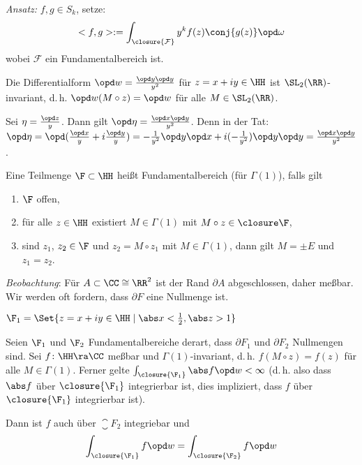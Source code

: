 \emph{Ansatz:} $f, g \in S_k$, setze:
\[
<f,g> := \int_{\closure{\mathcal F}} y^k f(z) \conj{g(z)} \opd \omega
\]
wobei $\mathcal F$ ein Fundamentalbereich ist.


\begin{satz}
	Die Differentialform $\opd w = \frac{\opd y \opd y}{y^2}$ für $z=x+iy\in\HH$ ist $\SL_2(\RR)$-invariant, d.\,h. $\opd w(M\circ z) = \opd w$ für alle $M\in\SL_2(\RR)$.
\end{satz}

\begin{beme}
	Sei $\eta = \frac{\opd z}{y}$. Dann gilt $\opd \eta = \frac{\opd x \opd y}{y^2}$.
	Denn in der Tat: $\opd \eta = \opd (\frac{\opd x}{y} + i\frac{\opd y}{y}) = -\frac{1}{y^2} \opd y \opd x + i(-\frac{1}{y^2}) \opd y \opd y = \frac{\opd x \opd y}{y^2}$.
\end{beme}

\begin{erin}
	Eine Teilmenge $\F \subset \HH$ heißt Fundamentalbereich (für $\Gamma(1)$), falls gilt
	\begin{enumerate}
		\item $\F$ offen,
		\item für alle $z\in\HH$ existiert $M \in \Gamma(1)$ mit $M \circ z \in \closure \F$,
		\item sind $z_1$, $z_2 \in \F$ und $z_2 = M \circ z_1$ mit $M \in \Gamma(1)$, dann gilt $M = \pm E$ und $z_1 = z_2$.
	\end{enumerate}
\end{erin}

\emph{Beobachtung}: Für $A \subset \CC \cong \RR^2$ ist der Rand $\partial A$ abgeschlossen, daher meßbar. Wir werden oft fordern, dass $\partial F$ eine Nullmenge ist.

\begin{bsp}
	$\F_1 = \Set{z = x+iy\in\HH \mid \abs x < \frac{1}{2}, \abs z > 1}$
\end{bsp}

\begin{satz}
	Seien $\F_1$ und $\F_2$ Fundamentalbereiche derart, dass $\partial F_1$ und $\partial F_2$ Nullmengen sind.
	Sei $f\colon \HH \ra \CC$ meßbar und $\Gamma(1)$-invariant, d.\,h. $f(M \circ z) = f(z)$ für alle $M \in \Gamma(1)$.
	Ferner gelte $\int_{\closure{\F_1}} \abs f \opd w < \infty$ (d.\,h. also dass $\abs f$ über $\closure{\F_1}$ integrierbar ist, dies impliziert, dass $f$ über $\closure{\F_1}$ integrierbar ist).
	
	Dann ist $f$ auch über $\closure{F_2}$ integriebar und
	\[
		\int_{\closure{\F_1}} f \opd w = \int_{\closure{\F_2}} f \opd w
	\]
\end{satz}

